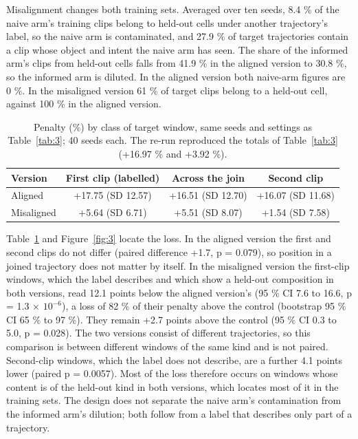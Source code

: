 \documentclass[10pt]{article}
\begin{document}
Misalignment changes both training sets. Averaged over ten seeds, 8.4 \% of the naive arm's training clips belong to held-out cells under another trajectory's label, so the naive arm is contaminated, and 27.9 \% of target trajectories contain a clip whose object and intent the naive arm has seen. The share of the informed arm's clips from held-out cells falls from 41.9 \% in the aligned version to 30.8 \%, so the informed arm is diluted. In the aligned version both naive-arm figures are 0 \%. In the misaligned version 61 \% of target clips belong to a held-out cell, against 100 \% in the aligned version.

\begin{table}[t]
\caption{Penalty (\%) by class of target window, same seeds and settings as Table~\ref{tab:3}; 40 seeds each. The re-run reproduced the totals of Table~\ref{tab:3} (+16.97 \% and +3.92 \%).}
\label{tab:4}
\begin{center}
\small
\setlength{\tabcolsep}{3pt}
\begin{tabular}{p{}ccc}
\toprule
\textbf{Version} & \textbf{First clip (labelled)} & \textbf{Across the join} & \textbf{Second clip} \\
\midrule
Aligned & +17.75 (SD 12.57) & +16.51 (SD 12.70) & +16.07 (SD 11.68) \\
Misaligned & +5.64 (SD 6.71) & +5.51 (SD 8.07) & +1.54 (SD 7.58) \\
\bottomrule
\end{tabular}
\end{center}
\end{table}

Table~\ref{tab:4} and Figure~\ref{fig:3} locate the loss. In the aligned version the first and second clips do not differ (paired difference +1.7, p = 0.079), so position in a joined trajectory does not matter by itself. In the misaligned version the first-clip windows, which the label describes and which show a held-out composition in both versions, read 12.1 points below the aligned version's (95 \% CI 7.6 to 16.6, p = 1.3 $\times$ $10^{-6}$), a loss of 82 \% of their penalty above the control (bootstrap 95 \% CI 65 \% to 97 \%). They remain +2.7 points above the control (95 \% CI 0.3 to 5.0, p = 0.028). The two versions consist of different trajectories, so this comparison is between different windows of the same kind and is not paired. Second-clip windows, which the label does not describe, are a further 4.1 points lower (paired p = 0.0057). Most of the loss therefore occurs on windows whose content is of the held-out kind in both versions, which locates most of it in the training sets. The design does not separate the naive arm's contamination from the informed arm's dilution; both follow from a label that describes only part of a trajectory.
\end{document}
